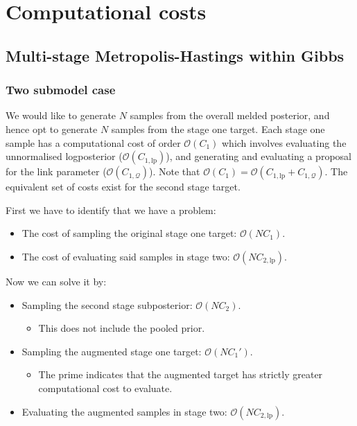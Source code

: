\documentclass[10pt,a4paper,]{article}
\providecommand{\tightlist}{%
  \setlength{\itemsep}{0pt}\setlength{\parskip}{0pt}}
\newcommand{\Nx}{N}
\begin{document}
\section{Computational costs}\label{computational-costs}

\subsection{Multi-stage Metropolis-Hastings within
Gibbs}\label{multi-stage-metropolis-hastings-within-gibbs}

\subsubsection*{Two submodel case}\label{two-submodel-case}

We would like to generate \(\Nx\) samples from the overall melded
posterior, and hence opt to generate \(\Nx\) samples from the stage one
target. Each stage one sample has a computational cost of order
\(\mathcal{O}(C_{1})\) which involves evaluating the unnormalised
logposterior (\(\mathcal{O}(C_{1, \text{lp}})\)), and generating and
evaluating a proposal for the link parameter
(\(\mathcal{O}(C_{1, \mathcal{Q}})\)). Note that
\(\mathcal{O}(C_{1}) = \mathcal{O}(C_{1, \text{lp}} + C_{1, \mathcal{Q}})\).
The equivalent set of costs exist for the second stage target.

First we have to identify that we have a problem:

\begin{itemize}
\tightlist
\item
  The cost of sampling the original stage one target:
  \(\mathcal{O}(\Nx C_{1})\).
\item
  The cost of evaluating said samples in stage two:
  \(\mathcal{O}(\Nx C_{2, \text{lp}})\).
\end{itemize}

Now we can solve it by:

\begin{itemize}
\tightlist
\item
  Sampling the second stage subposterior: \(\mathcal{O}(\Nx C_{2})\).

  \begin{itemize}
  \tightlist
  \item
    This does not include the pooled prior.
  \end{itemize}
\item
  Sampling the augmented stage one target: \(\mathcal{O}(\Nx C_{1}')\).

  \begin{itemize}
  \tightlist
  \item
    The prime indicates that the augmented target has strictly greater
    computational cost to evaluate.
  \end{itemize}
\item
  Evaluating the augmented samples in stage two:
  \(\mathcal{O}(\Nx C_{2, \text{lp}})\).
\end{itemize}
\end{document}
